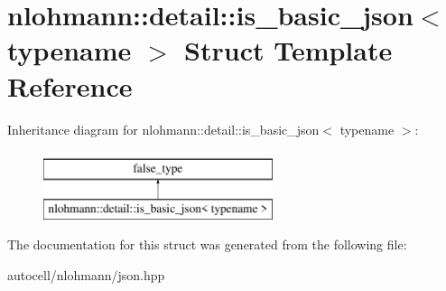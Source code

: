 \hypertarget{structnlohmann_1_1detail_1_1is__basic__json}{}\section{nlohmann\+:\+:detail\+:\+:is\+\_\+basic\+\_\+json$<$ typename $>$ Struct Template Reference}
\label{structnlohmann_1_1detail_1_1is__basic__json}
Inheritance diagram for nlohmann\+:\+:detail\+:\+:is\+\_\+basic\+\_\+json$<$ typename $>$\+:\begin{figure}[H]
\begin{center}
\leavevmode
\includegraphics[height=2.000000cm]{structnlohmann_1_1detail_1_1is__basic__json}
\end{center}
\end{figure}


The documentation for this struct was generated from the following file\+:\begin{DoxyCompactItemize}
\item 
autocell/nlohmann/json.\+hpp\end{DoxyCompactItemize}
